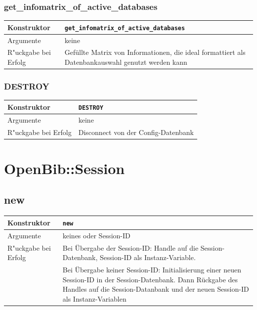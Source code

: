 \documentclass[11pt, twoside, a4paper, BCOR8mm, DIV12, bibtotoc,idxtotoc]{scrbook}
\begin{document}
\subsubsection{get\_infomatrix\_of\_active\_databases}
\begin{shadowenv}
\begin{tabular}{lp{10cm}}
  Konstruktor & \texttt{get\_infomatrix\_of\_active\_databases}\\
  \hline
  Argumente     & keine\\
  R"uckgabe bei Erfolg & Gefüllte Matrix von Informationen, die ideal
  formattiert als Datenbankauswahl genutzt werden kann\\
\end{tabular}
\end{shadowenv}

\subsubsection{DESTROY}
\begin{shadowenv}
\begin{tabular}{lp{10cm}}
  Konstruktor & \texttt{DESTROY}\\
  \hline
  Argumente     & keine\\
  R"uckgabe bei Erfolg & Disconnect von der Config-Datenbank\\
\end{tabular}
\end{shadowenv}

\section{OpenBib::Session}

\subsection{new}
\begin{shadowenv}
\begin{tabular}{lp{10cm}}
  Konstruktor & \texttt{new}\\
  \hline
  Argumente     & keines oder Session-ID\\
  R"uckgabe bei Erfolg & Bei Übergabe der Session-ID: Handle auf die
  Session-Datenbank, Session-ID als Instanz-Variable.\\
  & Bei Übergabe keiner Session-ID: Initialisierung einer neuen
  Session-ID in der Session-Datenbank. Dann Rückgabe des Handles auf
  die Session-Datanbank und der neuen Session-ID als Instanz-Variablen\\
\end{tabular}
\end{shadowenv}
\end{document}
